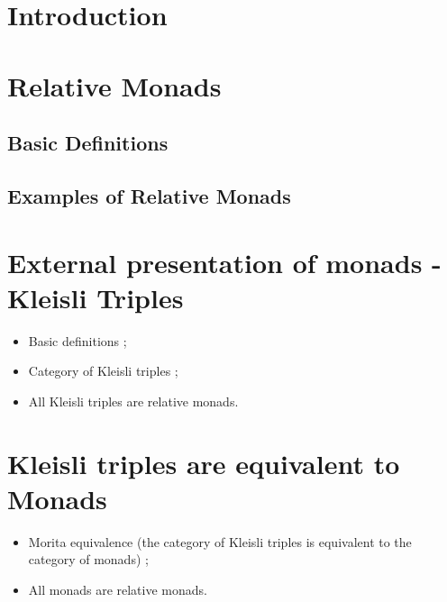 %

\section{Introduction}


\section{Relative Monads}
\subsection{Basic Definitions}
\subsection{Examples of Relative Monads}



\section{External presentation of monads - Kleisli Triples}
\begin{itemize}
\item Basic definitions ;
\item Category of Kleisli triples ;
  \item All Kleisli triples are relative monads.
\end{itemize}



\section{Kleisli triples are equivalent to Monads}
\begin{itemize}
\item Morita equivalence (the category of Kleisli triples is equivalent to the category of monads) ;
\item All monads are relative monads.  
\end{itemize}

